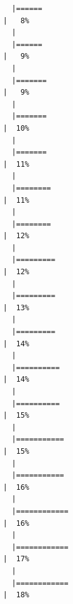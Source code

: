 \documentclass[
  letterpaper,
  DIV=11,
  numbers=noendperiod]{scrreprt}
\begin{document}
\begin{verbatim}
  |======                                                                |   8%
  |                                                                            
  |======                                                                |   9%
  |                                                                            
  |=======                                                               |   9%
  |                                                                            
  |=======                                                               |  10%
  |                                                                            
  |=======                                                               |  11%
  |                                                                            
  |========                                                              |  11%
  |                                                                            
  |========                                                              |  12%
  |                                                                            
  |=========                                                             |  12%
  |                                                                            
  |=========                                                             |  13%
  |                                                                            
  |=========                                                             |  14%
  |                                                                            
  |==========                                                            |  14%
  |                                                                            
  |==========                                                            |  15%
  |                                                                            
  |===========                                                           |  15%
  |                                                                            
  |===========                                                           |  16%
  |                                                                            
  |============                                                          |  16%
  |                                                                            
  |============                                                          |  17%
  |                                                                            
  |============                                                          |  18%

\end{verbatim}
\end{document}
